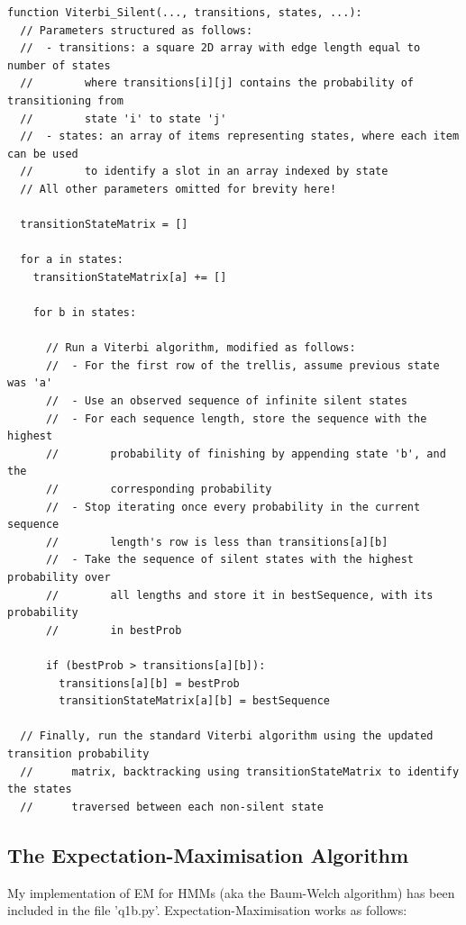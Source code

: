 \documentclass[11pt]{article} %
\begin{document}
\begin{landscape}
\hphantom{6.9cm}
\vspace{-1.0cm}
\begin{lstlisting}
function Viterbi_Silent(..., transitions, states, ...):
  // Parameters structured as follows:
  //  - transitions: a square 2D array with edge length equal to number of states
  //        where transitions[i][j] contains the probability of transitioning from
  //        state 'i' to state 'j'
  //  - states: an array of items representing states, where each item can be used
  //        to identify a slot in an array indexed by state
  // All other parameters omitted for brevity here!

  transitionStateMatrix = []

  for a in states:
    transitionStateMatrix[a] += []

    for b in states:

      // Run a Viterbi algorithm, modified as follows:
      //  - For the first row of the trellis, assume previous state was 'a'
      //  - Use an observed sequence of infinite silent states
      //  - For each sequence length, store the sequence with the highest
      //        probability of finishing by appending state 'b', and the
      //        corresponding probability
      //  - Stop iterating once every probability in the current sequence
      //        length's row is less than transitions[a][b]
      //  - Take the sequence of silent states with the highest probability over
      //        all lengths and store it in bestSequence, with its probability
      //        in bestProb

      if (bestProb > transitions[a][b]):
        transitions[a][b] = bestProb
        transitionStateMatrix[a][b] = bestSequence
  
  // Finally, run the standard Viterbi algorithm using the updated transition probability
  //      matrix, backtracking using transitionStateMatrix to identify the states
  //      traversed between each non-silent state
\end{lstlisting}
\end{landscape}


\subsection{The Expectation-Maximisation Algorithm}
My implementation of EM for HMMs (aka the Baum-Welch algorithm) has been included in the file 'q1b.py'. Expectation-Maximisation works as follows:
\end{document}
